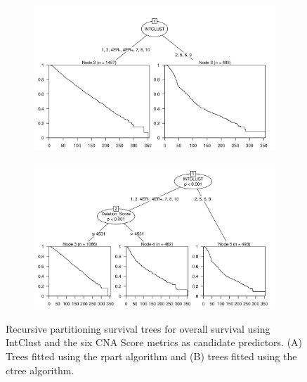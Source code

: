 \begin{figure}[!htb]
\centering

\vspace{0.5cm}

\begin{subfigure}{\textwidth}
\subcaption{}
\includegraphics[width=1\textwidth]{../figures/Appendices/Appendix_B/PartyKit_Survival_Score_OS_INTCLUST.png}
\end{subfigure}

\vspace{2cm}

\begin{subfigure}{\textwidth}
\subcaption{}
\includegraphics[width=1\textwidth]{../figures/Appendices/Appendix_B/Ctree_Survival_Score_OS_INTCLUST.png}
\end{subfigure}

\vspace{0.5cm}

\caption[Recursive partitioning survival trees for overall survival using IntClust and the six CNA Score metrics as candidate predictors.]{Recursive partitioning survival trees for overall survival using IntClust and the six CNA Score metrics as candidate predictors. (A) Trees fitted using the rpart algorithm and (B) trees fitted using the ctree algorithm.}
\end{figure}

